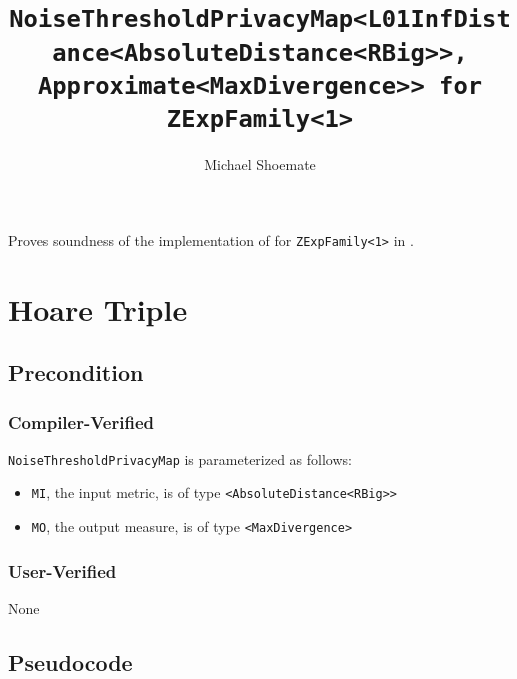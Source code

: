 \documentclass{article}
\title{\texttt{NoiseThresholdPrivacyMap<L01InfDistance<AbsoluteDistance<RBig>>, Approximate<MaxDivergence>> for ZExpFamily<1>}}
\author{Michael Shoemate}
\date{}
\begin{document}
\maketitle

\contrib
Proves soundness of the implementation of  for \texttt{ZExpFamily<1>} in .

\section{Hoare Triple}
\subsection*{Precondition}
\subsubsection*{Compiler-Verified}
\texttt{NoiseThresholdPrivacyMap} is parameterized as follows:
\begin{itemize}
    \item \texttt{MI}, the input metric, is of type \texttt{<AbsoluteDistance<RBig>>}
    \item \texttt{MO}, the output measure, is of type \texttt{<MaxDivergence>}
\end{itemize}

\subsubsection*{User-Verified}
None

\subsection*{Pseudocode}

\end{document}
